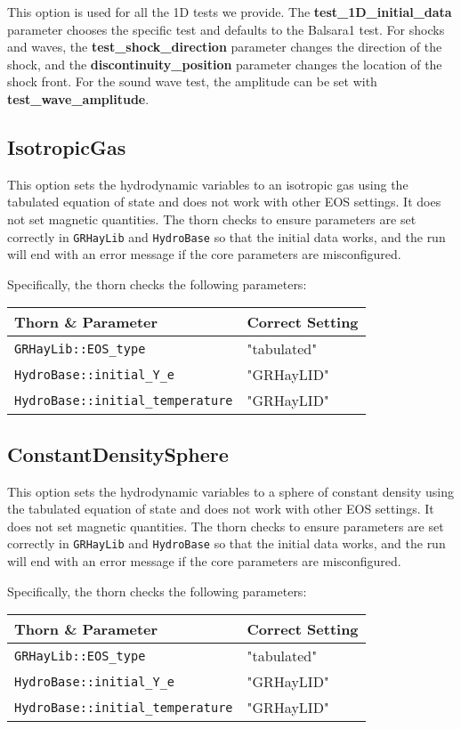 \documentclass{article}
\begin{document}
This option is used for all the 1D tests we provide. The
\textbf{test\_1D\_initial\_data} parameter chooses the
specific test and defaults to the Balsara1 test. For shocks and
waves, the \textbf{test\_shock\_direction} parameter changes the
direction of the shock, and the \textbf{discontinuity\_position}
parameter changes the location of the shock front. For the sound
wave test, the amplitude can be set with \textbf{test\_wave\_amplitude}.

\subsection{IsotropicGas}

This option sets the hydrodynamic variables to an isotropic gas using
the tabulated equation of state and does not work with other EOS
settings. It does not set magnetic quantities. The thorn checks to
ensure parameters are set correctly in \texttt{GRHayLib} and
\texttt{HydroBase} so that the initial data works, and the run will end
with an error message if the core parameters are misconfigured.

Specifically, the thorn checks the following parameters:
\begin{tabular}{l|l}
Thorn \& Parameter & Correct Setting \\\hline
\texttt{GRHayLib::EOS\_type} & "tabulated" \\
\texttt{HydroBase::initial\_Y\_e} & "GRHayLID" \\
\texttt{HydroBase::initial\_temperature} & "GRHayLID"
\end{tabular}

\subsection{ConstantDensitySphere}

This option sets the hydrodynamic variables to a sphere of constant
density using the tabulated equation of state and does not work
with other EOS settings. It does not set magnetic quantities. The thorn
checks to ensure parameters are set correctly in \texttt{GRHayLib} and
\texttt{HydroBase} so that the initial data works, and the run will end
with an error message if the core parameters are misconfigured.

Specifically, the thorn checks the following parameters:
\begin{tabular}{l|l}
Thorn \& Parameter & Correct Setting \\\hline
\texttt{GRHayLib::EOS\_type} & "tabulated" \\
\texttt{HydroBase::initial\_Y\_e} & "GRHayLID" \\
\texttt{HydroBase::initial\_temperature} & "GRHayLID"
\end{tabular}

\end{document}
